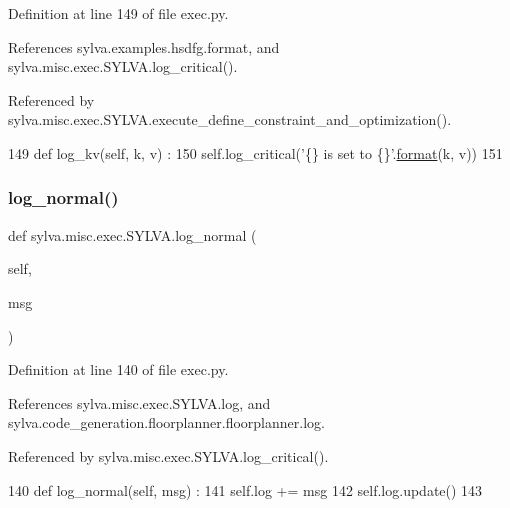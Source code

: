 Definition at line 149 of file exec.\+py.



References sylva.\+examples.\+hsdfg.\+format, and sylva.\+misc.\+exec.\+S\+Y\+L\+V\+A.\+log\+\_\+critical().



Referenced by sylva.\+misc.\+exec.\+S\+Y\+L\+V\+A.\+execute\+\_\+define\+\_\+constraint\+\_\+and\+\_\+optimization().


\begin{DoxyCode}
149   \textcolor{keyword}{def }log\_kv(self, k, v) :
150       self.log\_critical(\textcolor{stringliteral}{'\{\} is set to \{\}'}.\hyperlink{namespacesylva_1_1examples_1_1hsdfg_ab3510a0b8457362330aa4d9fd2209590}{format}(k, v))
151 
\end{DoxyCode}
\mbox{\label{classsylva_1_1misc_1_1exec_1_1_s_y_l_v_a_a6aec517802adb215a4b47d9149f63944}} 
\subsubsection{\texorpdfstring{log\+\_\+normal()}{log\_normal()}}
{\footnotesize\ttfamily def sylva.\+misc.\+exec.\+S\+Y\+L\+V\+A.\+log\+\_\+normal (\begin{DoxyParamCaption}\item[{}]{self,  }\item[{}]{msg }\end{DoxyParamCaption})}



Definition at line 140 of file exec.\+py.



References sylva.\+misc.\+exec.\+S\+Y\+L\+V\+A.\+log, and sylva.\+code\+\_\+generation.\+floorplanner.\+floorplanner.\+log.



Referenced by sylva.\+misc.\+exec.\+S\+Y\+L\+V\+A.\+log\+\_\+critical().


\begin{DoxyCode}
140   \textcolor{keyword}{def }log\_normal(self, msg) :
141     self.log += msg
142     self.log.update()
143 
\end{DoxyCode}
\mbox{\label{classsylva_1_1misc_1_1exec_1_1_s_y_l_v_a_a689ffc2470814b85264167e77517c1e6}} 
